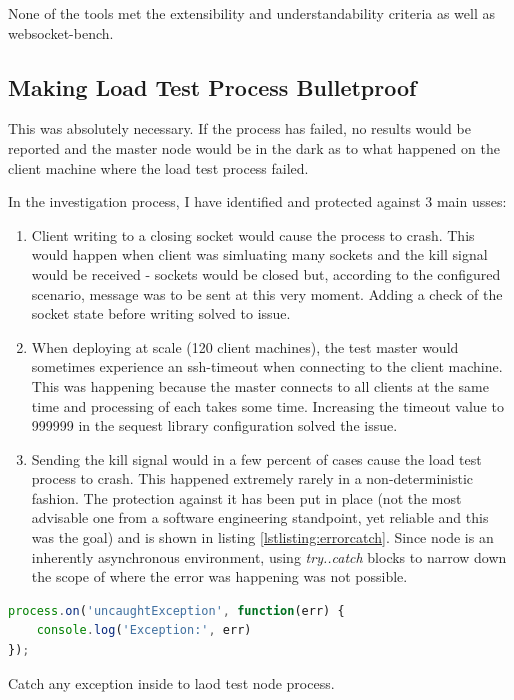 \documentclass{uvamscse}
\begin{document}
None of the tools met the extensibility and understandability criteria as well as websocket-bench.

\subsection{Making Load Test Process Bulletproof}
This was absolutely necessary. If the process has failed, no results would be reported and the master node would be in the dark as to what happened on the client machine where the load test process failed.

In the investigation process, I have identified and protected against 3 main usses:

\begin{enumerate}
  \item Client writing to a closing socket would cause the process to crash. This would happen when client was simluating many sockets and the kill signal would be received - sockets would be closed but, according to the configured scenario, message was to be sent at this very moment. Adding a check of the socket state before writing solved to issue.
  \item When deploying at scale (120 client machines), the test master would sometimes experience an ssh-timeout when connecting to the client machine. This was happening because the master connects to all clients at the same time and processing of each takes some time. Increasing the timeout value to 999999 in the sequest library configuration solved the issue.
  \item Sending the kill signal would in a few percent of cases cause the load test process to crash. This happened extremely rarely in a non-deterministic fashion. The protection against it has been put in place (not the most advisable one from a software engineering standpoint, yet reliable and this was the goal) and is shown in listing \ref{lstlisting:errorcatch}. Since node is an inherently asynchronous environment, using \textit{try..catch} blocks to narrow down the scope of where the error was happening was not possible.
\end{enumerate}

\begin{sourcecode}[H]
\begin{lstlisting}[language=javascript]
process.on('uncaughtException', function(err) {
    console.log('Exception:', err)
});
\end{lstlisting}
\caption{Catch any exception inside to laod test node process.}
\label{lstlisting:errorcatch}
\end{sourcecode}
\end{document}
